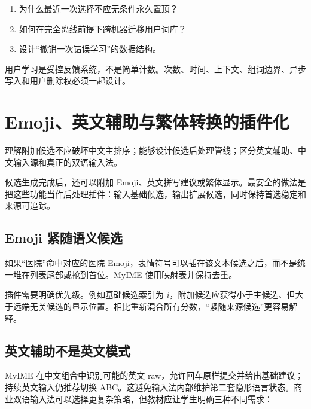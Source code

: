 \exercises
\begin{enumerate}
  \item 为什么最近一次选择不应无条件永久置顶？
  \item 如何在完全离线前提下跨机器迁移用户词库？
  \item 设计“撤销一次错误学习”的数据结构。
\end{enumerate}

\begin{summarybox}
用户学习是受控反馈系统，不是简单计数。次数、时间、上下文、组词边界、异步写入和用户删除权必须一起设计。
\end{summarybox}


\chapter{Emoji、英文辅助与繁体转换的插件化}

\begin{goals}
理解附加候选不应破坏中文主排序；能够设计候选后处理管线；区分英文辅助、中文输入源和真正的双语输入法。
\end{goals}

候选生成完成后，还可以附加 Emoji、英文拼写建议或繁体显示。最安全的做法是把这些功能当作后处理插件：输入基础候选，输出扩展候选，同时保持首选稳定和来源可追踪。

\section{Emoji 紧随语义候选}

如果“医院”命中对应的医院 Emoji，表情符号可以插在该文本候选之后，而不是统一堆在列表尾部或抢到首位。MyIME 使用映射表并保持去重。



插件需要明确优先级。例如基础候选索引为 \(i\)，附加候选应获得小于主候选、但大于远端无关候选的显示位置。相比重新混合所有分数，“紧随来源候选”更容易解释。

\section{英文辅助不是英文模式}

MyIME 在中文组合中识别可能的英文 raw，允许回车原样提交并给出基础建议；持续英文输入仍推荐切换 ABC。这避免输入法内部维护第二套隐形语言状态。商业双语输入法可以选择更复杂策略，但教材应让学生明确三种不同需求：

